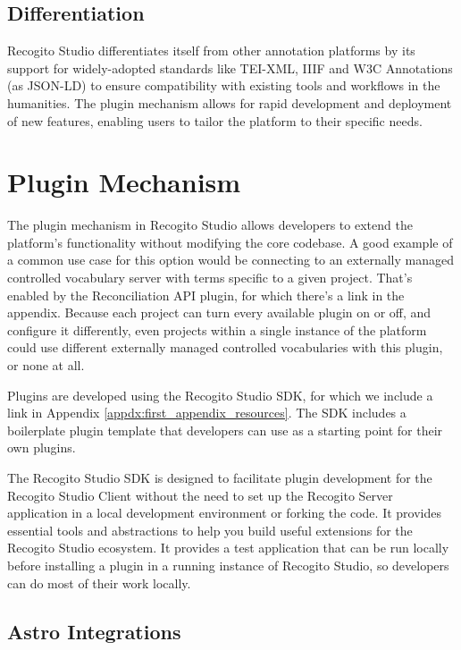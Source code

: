 \documentclass[final]{anthology-ch}         %
\begin{document}
\subsection{Differentiation} \label{sec:overview_differentiation}
Recogito Studio differentiates itself from other annotation platforms by its support for widely-adopted standards like TEI-XML, IIIF and W3C Annotations (as JSON-LD) to ensure compatibility with existing tools and workflows in the humanities. The plugin mechanism allows for rapid development and deployment of new features, enabling users to tailor the platform to their specific needs.

\section{Plugin Mechanism}

The plugin mechanism in Recogito Studio allows developers to extend the platform's functionality without modifying the core codebase. A good example of a common use case for this option would be connecting to an externally managed controlled vocabulary server with terms specific to a given project. That's enabled by the Reconciliation API plugin, for which there's a link in the appendix. Because each project can turn every available plugin on or off, and configure it differently, even projects within a single instance of the platform could use different externally managed controlled vocabularies with this plugin, or none at all.

Plugins are developed using the Recogito Studio SDK, for which we include a link in Appendix \ref{appdx:first_appendix_resources}. The SDK includes a boilerplate plugin template that developers can use as a starting point for their own plugins.

The Recogito Studio SDK is designed to facilitate plugin development for the Recogito Studio Client without the need to set up the Recogito Server application in a local development environment or forking the code. It provides essential tools and abstractions to help you build useful extensions for the Recogito Studio ecosystem. It provides a test application that can be run locally before installing a plugin in a running instance of Recogito Studio, so developers can do most of their work locally.

\subsection{Astro Integrations} \label{sec:plugins_astro_integrations}
\end{document}
